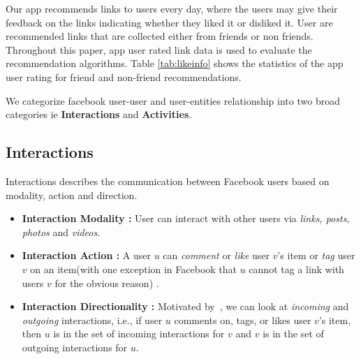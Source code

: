 Our app recommends links to users every day, where the users may give their feedback on the links indicating whether they liked it or disliked it. User are recommended
links that are collected either from friends or non friends. Throughout this paper, app user rated link data is used to evaluate the recommendation algorithms. 
Table \ref{tab:likeinfo} shows the statistics of the app user rating for friend and non-friend recommendations.

We categorize facebook user-user and user-entities relationship into two broad categories ie \textbf{Interactions} and \textbf{Activities}.

\subsection{Interactions}
Interactions describes the communication between Facebook users based on modality, action and direction.
\begin{itemize}
\item \textbf{Interaction Modality :}  User can interact with other users via
									 \textit{links, posts, photos} and \textit{videos}.
\item \textbf{Interaction Action :}  A user $u$ can \textit{comment} or \textit{like} 
									user $v$'s item or \textit{tag} user $v$ on an 
									item(with one exception in Facebook that $u$ cannot tag a 
									link with users $v$ for the obvious reason) .
\item \textbf{Interaction Directionality :} Motivated by~\cite{saez2011high}, we can look
      								at \textit{incoming} and \textit{outgoing} interactions, i.e.,
      								if user $u$ comments on, tags, or likes user $v$'s item,
      								then $u$ is in the set of incoming interactions for $v$
      								and $v$ is in the set of outgoing interactions for $u$.
      								
\end{itemize}								

